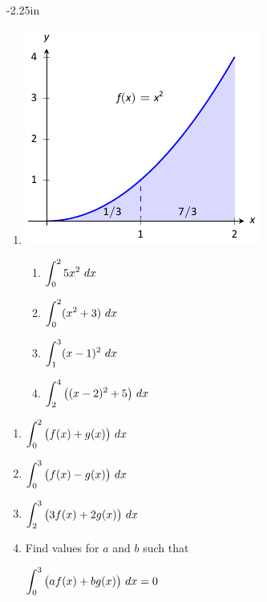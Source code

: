 \begin{adjustwidth*}{}{-2.25in}
\begin{multicols*}{2}
\begin{enumerate}[1),start=11]
\item \noindent
\begin{minipage}{\linewidth}
\includegraphics[scale=.8]{figures/fig05_02_ex_13}
\end{minipage}
\bmtwo
\begin{enumerate}
\item		$\ds \int_{0}^{2} 5x^2\ dx$
\item		$\ds \int_0^2 (x^2+3)\ dx$
\item		$\ds \int_{1}^3 (x-1)^2\ dx$
\item		$\ds \int_2^4 \big((x-2)^2+5\big)\ dx$
\end{enumerate}
\emtwo

\end{enumerate}


\begin{enumerate}[1),resume]
\item $\ds \int_0^2 \big(f(x)+g(x)\big) \ dx$
\item $\ds \int_0^3 \big(f(x)-g(x)\big) \ dx$
\item $\ds \int_2^3 \big(3f(x)+2g(x)\big) \ dx$
\item Find values for $a$ and $b$ such that 

$\ds \int_0^3 \big(af(x)+bg(x)\big) \ dx=0$
\end{enumerate}


\end{multicols*}
\end{adjustwidth*}

